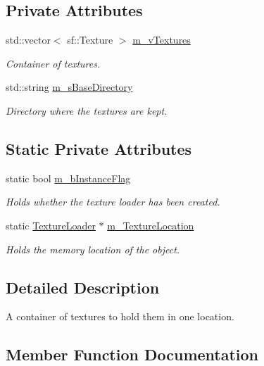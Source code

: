 \subsection*{Private Attributes}
\begin{DoxyCompactItemize}
\item 
std\+::vector$<$ sf\+::\+Texture $>$ \hyperlink{class_texture_loader_ae3323f23889f99c1b7f0fb5c6a2928e9}{m\+\_\+v\+Textures}
\begin{DoxyCompactList}\small\item\em Container of textures. \end{DoxyCompactList}\item 
std\+::string \hyperlink{class_texture_loader_ac5b4056169e4b006bfb98a1555365697}{m\+\_\+s\+Base\+Directory}
\begin{DoxyCompactList}\small\item\em Directory where the textures are kept. \end{DoxyCompactList}\end{DoxyCompactItemize}
\subsection*{Static Private Attributes}
\begin{DoxyCompactItemize}
\item 
static bool \hyperlink{class_texture_loader_a16bfee9b71c238abe08c2fce039ef1f9}{m\+\_\+b\+Instance\+Flag}
\begin{DoxyCompactList}\small\item\em Holds whether the texture loader has been created. \end{DoxyCompactList}\item 
static \hyperlink{class_texture_loader}{Texture\+Loader} $\ast$ \hyperlink{class_texture_loader_af55fbb100f2475a2d698af957bbd599f}{m\+\_\+\+Texture\+Location}
\begin{DoxyCompactList}\small\item\em Holds the memory location of the object. \end{DoxyCompactList}\end{DoxyCompactItemize}


\subsection{Detailed Description}
A container of textures to hold them in one location. 

\subsection{Member Function Documentation}
\mbox{\label{class_texture_loader_ad606fa221b1796e88e102e8d1f0cf357}} 
